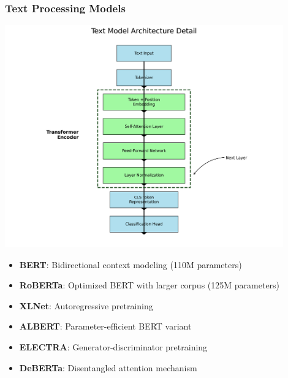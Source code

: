 \documentclass{beamer}
\begin{document}
\begin{frame}
\frametitle{Text Processing Models}
\begin{center}
\includegraphics[width=0.9\textwidth]{figures/text_model_architecture.png}
\end{center}

\begin{itemize}
    \item \textbf{BERT}: Bidirectional context modeling (110M parameters)
    \item \textbf{RoBERTa}: Optimized BERT with larger corpus (125M parameters)
    \item \textbf{XLNet}: Autoregressive pretraining
    \item \textbf{ALBERT}: Parameter-efficient BERT variant
    \item \textbf{ELECTRA}: Generator-discriminator pretraining
    \item \textbf{DeBERTa}: Disentangled attention mechanism
\end{itemize}
\end{frame}
\end{document}
